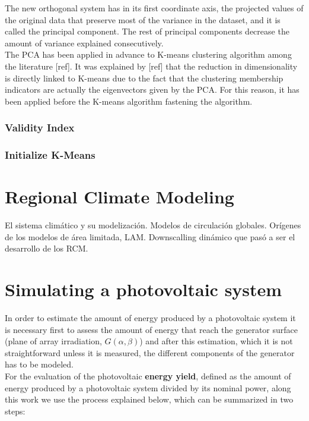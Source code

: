 The new orthogonal system has in its first coordinate axis, the projected values of the original data that preserve most of the variance in the dataset, and it is called the principal component. The rest of principal components decrease the amount of variance explained consecutively.\\

The PCA has been applied in advance to K-means clustering algorithm among the literature [ref]. It was explained by [ref] that the reduction in dimensionality is directly linked to K-means due to the fact that the clustering membership indicators are actually the eigenvectors given by the PCA. For this reason, it has been applied before the K-means algorithm fastening the algorithm.\\

\subsubsection{Validity Index}

\subsubsection{Initialize K-Means}

\section{Regional Climate Modeling}

El sistema climático y su modelización. Modelos de circulación globales. Orígenes de los modelos de área limitada, LAM. Downscalling dinámico que pasó a ser el desarrollo de los RCM.

\section{Simulating a photovoltaic system}

In order to estimate the amount of energy produced by a photovoltaic system it is necessary first to assess the amount of energy that reach the generator surface (plane of array irradiation, $G(\alpha, \beta)$) and after this estimation, which it is not straightforward unless it is measured, the different components of the generator has to be modeled.\\

For the evaluation of the photovoltaic \textbf{energy yield}, defined as the amount of energy produced by a photovoltaic system divided by its nominal power, along this work we use the process explained below, which can be summarized in two steps:

